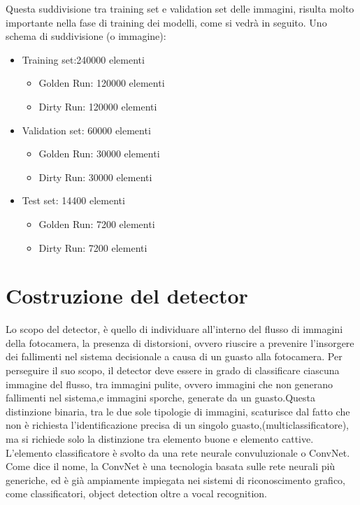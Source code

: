 \documentclass[14pt]{extarticle}
\begin{document}
Questa suddivisione tra training set e validation set delle immagini, risulta molto importante nella fase di training dei modelli, come si vedrà in seguito.
Uno schema di suddivisione (o immagine):
\begin{itemize}
\item Training set:240000 elementi
\begin{itemize}
\item Golden Run: 120000 elementi
\item Dirty Run: 120000 elementi
\end{itemize}
\item Validation set: 60000 elementi
\begin{itemize}
\item Golden Run: 30000 elementi
\item Dirty Run: 30000 elementi
\end{itemize}
\item Test set: 14400 elementi
\begin{itemize}
\item Golden Run: 7200 elementi
\item Dirty Run: 7200 elementi
\end{itemize}
\end{itemize}

\section{Costruzione del detector}
Lo scopo del detector, è quello di individuare all'interno del flusso di immagini della fotocamera, la presenza di distorsioni, ovvero riuscire a prevenire l'insorgere dei fallimenti nel sistema decisionale a causa di un guasto alla fotocamera. Per perseguire il suo scopo, il detector deve essere in grado di classificare ciascuna immagine del flusso, tra immagini pulite, ovvero immagini che non generano fallimenti nel sistema,e immagini sporche, generate da un guasto.Questa distinzione binaria, tra le due sole tipologie di immagini, scaturisce dal fatto che non è richiesta l'identificazione precisa di un singolo guasto,(multiclassificatore), ma si richiede solo la distinzione tra elemento buone e elemento cattive.
L'elemento classificatore è svolto da una rete neurale convuluzionale o ConvNet.
Come dice il nome, la  ConvNet è  una tecnologia basata sulle rete neurali più generiche, ed è già ampiamente impiegata nei sistemi di riconoscimento grafico, come classificatori, object detection oltre a vocal recognition.
\end{document}

